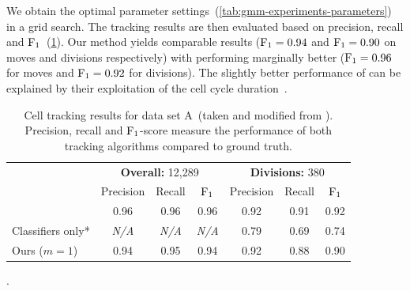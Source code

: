 We obtain the optimal parameter settings~(\cref{tab:gmm-experiments-parameters}) in a grid
search. The tracking results are then evaluated based on precision, recall and
$\operatorname{F}_{1}$~(\cref{tab:gmm-experiments-data-a-results}). Our method yields comparable results
($\operatorname{F}_{1}=0.94$ and $\operatorname{F}_{1}=0.90$ on moves and divisions respectively) with
\citet{kausler_12_discrete} performing marginally better ($\operatorname{F}_{1}=0.96$ for moves and
$\operatorname{F}_{1}=0.92$ for divisions). The slightly better performance of \citet{kausler_12_discrete} can
be explained by their exploitation of the cell cycle
duration~\citep[Figure~5b]{kausler_12_discrete}.

\begin{table}
\centering
\begin{tabular}{l||ccc|ccc}
    \toprule
							& \multicolumn{3}{c|}{\textbf{Overall:} 12,289 } & \multicolumn{3}{c}{\textbf{Divisions:} 380 }  \\
							& Precision & Recall & $\operatorname{F}_{1}$ &
                                                        Precision & Recall & $\operatorname{F}_{1}$    \\
\hline
\citet{kausler_12_discrete}& 0.96& 0.96 & 0.96  & 0.92     & 0.91 & 0.92    \\
Classifiers only*				        & \textit{N/A}   & \textit{N/A} & \textit{N/A} & 0.79 & 0.69 & 0.74 \\
Ours ($m=1$)						& 0.94        & 0.95 & 0.94  & 0.92      &
0.88 & 0.90   \\
\bottomrule
\end{tabular} 
\caption[Conservation tracking results: Data Set A]{Cell tracking results for data set A~(taken and
    modified from \citealp{schiegg_13_conservation}). Precision,
recall and $\operatorname{F}_{1}$-score measure the performance of both tracking algorithms compared to ground truth.}.
\label{tab:gmm-experiments-data-a-results}
\end{table}

